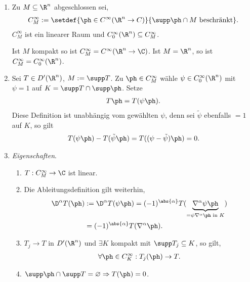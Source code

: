 \begin{prop}
\label{prop:3.37}
\begin{enumerate}[label=(\roman{*})]
  \item Zu $M\subseteq \R^n$ abgeschlossen sei,
\begin{align*}
C_M^\infty := \setdef{\ph\in C^\infty(\R^n\to C)}{\supp\ph\cap M\text{
beschränkt}}.
\end{align*}
$C_M^\infty$ ist ein linearer Raum und $C_0^\infty(\R^n)\subseteq C_M^\infty$.

Ist $M$ kompakt so ist $C_M^\infty = C^\infty(\R^n\to\C)$. Ist $M=\R^n$, so ist
$C_M^\infty = C_0^\infty(\R^n)$.
\item Sei $T\in D'(\R^n)$, $M:=\supp T$. Zu $\ph\in C_M^\infty$ wähle $\psi\in
C_0^\infty(\R^n)$ mit $\psi=1$ auf $K=\supp T\cap \supp\ph$. Setze
\begin{align*}
T\ph = T(\psi\ph).
\end{align*}
Diese Definition ist unabhängig vom gewählten $\psi$, denn sei $\tilde{\psi}$
ebenfalls $=1$ auf $K$, so gilt
\begin{align*}
T(\psi\ph) - T(\tilde{\psi}\ph) =T((\psi-\tilde{\psi})\ph)  = 0.
\end{align*}
\item \textit{Eigenschaften}. 
\begin{enumerate}[label=(\alph{*})]
  \item $T: C_M^\infty \to \C$ ist linear.
\item Die Ableitungsdefinition gilt weiterhin,
\begin{align*}
\D^\alpha T(\ph) &:= \D^\alpha T(\psi\ph) = (-1)^{\abs{\alpha}}
T(\underbrace{\nabla^\alpha \psi\ph}_{=\psi\nabla^\alpha\ph\text{ in }K}) \\ &=
(-1)^{\abs{\alpha}} T(\nabla^\alpha \ph).
\end{align*}
\item $T_j\to T$ in $D'(\R^n)$ und $\exists K$ kompakt mit $\supp T_j\subseteq
K$, so gilt,
\begin{align*}
\forall \ph\in C_K^\infty : T_j(\ph)\to T.
\end{align*}
\item $\supp \ph\cap \supp T=\varnothing \Rightarrow T(\ph) = 0$.\fishhere
\end{enumerate}
\end{enumerate}
\end{prop}

